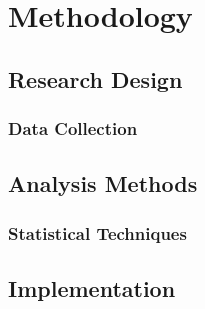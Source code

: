 \chapter{Methodology}
\label{ch:methodology}

\lipsum[19-20]

\section{Research Design}
\label{sec:research-design}

\lipsum[21-22]

\subsection{Data Collection}
\label{subsec:data-collection}

\lipsum[23]

\section{Analysis Methods}
\label{sec:analysis-methods}

\lipsum[24-25]

\subsection{Statistical Techniques}
\label{subsec:statistical-techniques}

\lipsum[26]

\section{Implementation}
\label{sec:implementation}

\lipsum[27-28]
